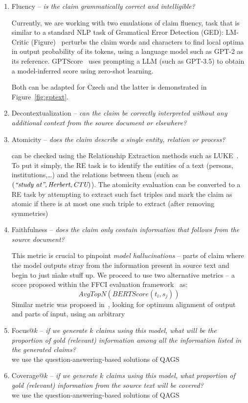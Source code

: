 \begin{enumerate}
    \item {\techbf Fluency} -- \textit{is the claim grammatically correct and intelligible?}
    
    Currently, we are working with two emulations of claim fluency, task that is similar to a standard NLP task of Gramatical Error Detection (GED): \textsf{LM-Critic} (Figure)~\cite{yasunaga-etal-2021-lm} perturbs the claim words and characters to find local optima in output probability of its tokens, using a language model such as GPT-2 as its reference. \textsf{GPTScore}~\cite{fu2023gptscore} uses prompting a LLM (such as GPT-3.5) to obtain a model-inferred score using zero-shot learning.
    
    Both can be adapted for Czech and the latter is demonstrated in Figure~\ref{fig:gptext}.
    \item {\techbf Decontextualization} -- \textit{can the claim be correctly interpreted without any additional context from the source document or elsewhere?}\\
    \item {\techbf Atomicity} --  \textit{does the claim describe a single entity, relation or process?}
    
    can be checked using the Relationship Extraction methods such as LUKE~\cite{yamada2020luke}. To put it simply, the RE task is to identify the entities of a text (persons, institutions,\dots) and the relations between them (such as $(\textit{\"{study at}}, \textit{Herbert}, \textit{CTU})$). The atomicity evaluation can be converted to a RE task by attempting to extract such fact triples and mark the claim as atomic if there is at most one such triple to extract (after removing symmetries)
    \item {\techbf Faithfulness} -- \textit{does the claim only contain information that follows from the source document?}
    
    This metric is crucial to pinpoint \textit{model hallucinations} -- parts of claim where the model outputs stray from the information present in source text and begin to just \"{make stuff up}. We proceed to use two alternative metrics -- a score proposed within the FFCI evaluation framework~\cite{ffci} as: 
    $$AvgTopN(BERTScore(t_i,s_j))$$
    Similar metric was proposed in~\cite{zha2023alignscore}, looking for optimum alignment of output and parts of input, using an arbitrary 
    \item {\techbf Focus}$@k$ -- \textit{if we generate $k$ claims using this model, what will be the proportion of gold (relevant) information among all the information listed in the generated claims?}\\
    we use the question-answering-based solutions of QAGS~\cite{wang-etal-2020-asking}
    \item {\techbf Coverage}$@k$ -- \textit{if we generate $k$ claims using this model, what proportion of gold (relevant) information from the source text will be covered?}\\
    we use the question-answering-based solutions of QAGS~\cite{wang-etal-2020-asking}
\end{enumerate}

